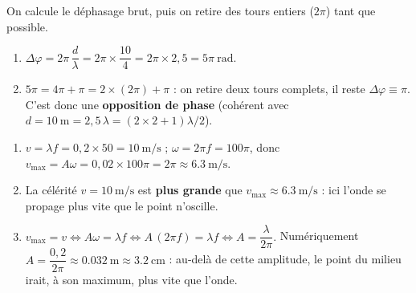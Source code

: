 \documentclass[11pt,a4paper]{article}
\begin{document}
\begin{corrige}
On calcule le déphasage brut, puis on retire des tours entiers ($2\pi$) tant que possible.
\begin{enumerate}[label=\alph*)]
  \item $\Delta\varphi=2\pi\,\dfrac{d}{\lambda}=2\pi\times\dfrac{10}{4}=2\pi\times 2{,}5=5\pi\ \si{\radian}.$
  \item $5\pi = 4\pi + \pi = 2\times(2\pi) + \pi$ : on retire deux tours complets, il reste
        $\Delta\varphi\equiv\pi$. C'est donc une \textbf{opposition de phase}
        (cohérent avec $d=\SI{10}{\metre}=2{,}5\,\lambda=(2\times2+1)\lambda/2$).
\end{enumerate}
\end{corrige}

\begin{corrige}
\begin{enumerate}[label=\alph*)]
  \item $v=\lambda f=0{,}2\times 50=\SI{10}{\metre\per\second}$ ;
        $\omega=2\pi f=100\pi$, donc
        $v_{\max}=A\omega=0{,}02\times 100\pi=2\pi\approx\SI{6.3}{\metre\per\second}.$
  \item La célérité $v=\SI{10}{\metre\per\second}$ est \textbf{plus grande} que
        $v_{\max}\approx\SI{6.3}{\metre\per\second}$ : ici l'onde se propage plus vite que le
        point n'oscille.
  \item $v_{\max}=v \iff A\omega=\lambda f \iff A\,(2\pi f)=\lambda f \iff A=\dfrac{\lambda}{2\pi}.$
        Numériquement $A=\dfrac{0{,}2}{2\pi}\approx\SI{0.032}{\metre}\approx\SI{3.2}{\centi\metre}$ :
        au-delà de cette amplitude, le point du milieu irait, à son maximum, plus vite que l'onde.
\end{enumerate}
\end{corrige}
\end{document}
